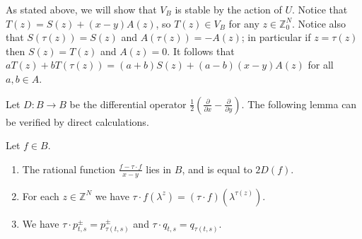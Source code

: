 \documentclass[11pt,fleqn]{article}
\newcommand\ZZ{\mathbb Z}
\renewcommand\to{\longrightarrow}
\begin{document}
As stated above, we will show that $V_B$ is stable by the action of $U$.
Notice that $T(z) = S(z) + (x-y)A(z)$, so $T(z) \in V_B$ for any $z \in 
\ZZ^N_0$. Notice also that $S(\tau(z)) = S(z)$ and $A(\tau(z)) = - A(z)$; 
in particular if $z = \tau(z)$ then $S(z) = T(z)$ and $A(z) = 0$. It follows 
that $a T(z) + b T(\tau(z)) = (a+b) S(z) + (a-b)(x-y)A(z)$ for all $a, b \in 
A$.

Let $D: B \to B$ be the differential operator $\frac{1}{2} \left(
\frac{\partial}{\partial x} - \frac{\partial}{\partial y} \right)$. The 
following lemma can be verified by direct calculations. 
\begin{Lemma}
\label{L:helpful}
Let $f \in B$.
\begin{enumerate}
\item \label{derivative}
The rational function $\frac{f - \tau \cdot f}{x-y}$ lies in $B$, and is equal
to $2 D(f)$.

\item \label{action1}
For each $z \in \ZZ^N$ we have $\tau \cdot f(\lambda^z) = (\tau \cdot f)
(\lambda^{\tau(z)})$. 

\item \label{action2}
We have $\tau \cdot p_{t,s}^\pm = p_{\tau(t,s)}^\pm$ and $\tau \cdot 
q_{t,s} = q_{\tau(t,s)}$.
\end{enumerate}
\end{Lemma}
\end{document}
